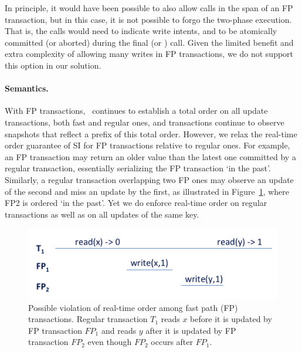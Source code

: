 {In principle, it would have been possible to also allow  calls in the span of an FP transaction, 
but in this case, it is not possible to forgo the two-phase execution. 
That is, the  calls would need to indicate write intents, and  to be atomically committed (or aborted) during the final  
(or ) call. 
Given the limited benefit and extra complexity of allowing many writes in FP transactions, we do not support this option in our solution.

}

\paragraph{Semantics.}

With FP transactions, 
\sys\ continues to establish a total order on all update transactions, both fast and regular ones, 
and transactions continue to observe snapshots that reflect a prefix of this total order.
However, we relax the real-time order guarantee of SI for FP transactions relative to regular ones. 
For example, an FP transaction may return 
an older value than the latest one committed by a regular transaction, essentially serializing the FP transaction `in the past'. 
Similarly, a regular transaction overlapping
two FP ones may observe an update of the second and miss an update by the first,  as illustrated in Figure~\ref{fig:ltx-rt},
where FP2 is ordered `in the past'.
Yet we do enforce real-time order on regular transactions as well as on all updates of the same key.

\begin{figure}[ht]
\includegraphics[width=\columnwidth]{figs/FP-semantics}
\caption{Possible violation of real-time order among fast path (FP) transactions. Regular transaction $T_1$
reads $x$ before it is updated by FP transaction $FP_1$ and reads $y$ after it is updated by FP transaction $FP_2$ even 
though $FP_2$ occurs after $FP_1$. 
}
\label{fig:ltx-rt}
\end{figure}

